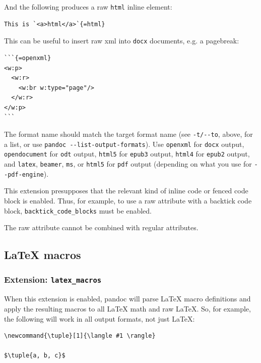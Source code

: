 \documentclass[
]{article}
\begin{document}
And the following produces a raw \texttt{html} inline element:

\begin{verbatim}
This is `<a>html</a>`{=html}
\end{verbatim}

This can be useful to insert raw xml into \texttt{docx} documents, e.g.
a pagebreak:

\begin{verbatim}
```{=openxml}
<w:p>
  <w:r>
    <w:br w:type="page"/>
  </w:r>
</w:p>
```
\end{verbatim}

The format name should match the target format name (see
\texttt{-t/-\/-to}, above, for a list, or use
\texttt{pandoc\ -\/-list-output-formats}). Use \texttt{openxml} for
\texttt{docx} output, \texttt{opendocument} for \texttt{odt} output,
\texttt{html5} for \texttt{epub3} output, \texttt{html4} for
\texttt{epub2} output, and \texttt{latex}, \texttt{beamer}, \texttt{ms},
or \texttt{html5} for \texttt{pdf} output (depending on what you use for
\texttt{-\/-pdf-engine}).

This extension presupposes that the relevant kind of inline code or
fenced code block is enabled. Thus, for example, to use a raw attribute
with a backtick code block, \texttt{backtick\_code\_blocks} must be
enabled.

The raw attribute cannot be combined with regular attributes.

\hypertarget{latex-macros}{%
\subsection{LaTeX macros}\label{latex-macros}}

\hypertarget{extension-latex_macros}{%
\subsubsection{\texorpdfstring{Extension:
\texttt{latex\_macros}}{Extension: latex\_macros}}\label{extension-latex_macros}}

When this extension is enabled, pandoc will parse LaTeX macro
definitions and apply the resulting macros to all LaTeX math and raw
LaTeX. So, for example, the following will work in all output formats,
not just LaTeX:

\begin{verbatim}
\newcommand{\tuple}[1]{\langle #1 \rangle}

$\tuple{a, b, c}$
\end{verbatim}
\end{document}
